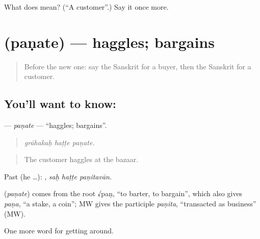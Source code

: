 \begin{tcolorbox}[breakable,colback=teal!4,colframe=teal!35!black,title={Before you move on}]
What does  mean? (\textquotedblleft{}A customer\textquotedblright{}.) Say it once more.
\end{tcolorbox}
\section[\texorpdfstring{\sk{पणते} (paṇate)}{पणते (paṇate)}]{ (paṇate) — haggles; bargains}

\label{lesson:SA-C430-panate}



\begin{quote}
Before the new one: say the Sanskrit for a buyer, then the Sanskrit for a customer.
\end{quote}

\subsection*{You'll want to know: }
\textbf{} — \emph{paṇate} — \textquotedblleft{}haggles; bargains\textquotedblright{}.

\begin{quote}
  
\end{quote}

\begin{quote}
\emph{grāhakaḥ haṭṭe paṇate.}
\end{quote}

\begin{quote}
The customer haggles at the bazaar.
\end{quote}

Past (he …):   , \emph{saḥ haṭṭe paṇitavān}.

\begin{cousinweb}
\textbf{} (\emph{paṇate}) comes from the root √paṇ, \textquotedblleft{}to barter, to bargain\textquotedblright{}, which also gives \emph{paṇa}, \textquotedblleft{}a stake, a coin\textquotedblright{}; MW gives the participle \emph{paṇita}, \textquotedblleft{}transacted as business\textquotedblright{} (MW).
\end{cousinweb}

\begin{grammarlens}[title={What you've built}]
One more word for getting around.
\end{grammarlens}

